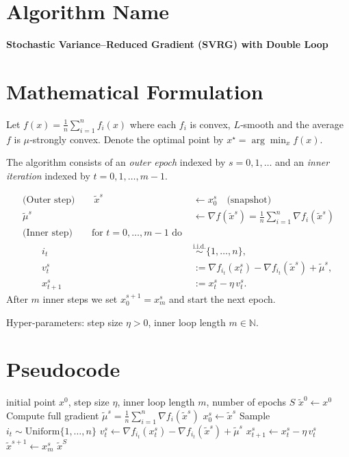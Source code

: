\documentclass[11pt]{article}
\newcommand{\grad}{\nabla}
\begin{document}
\section*{Algorithm Name}
\textbf{Stochastic Variance–Reduced Gradient (SVRG) with Double Loop}

\section*{Mathematical Formulation}
Let $f(x)=\frac{1}{n}\sum_{i=1}^{n}f_i(x)$ where each $f_i$ is convex, $L$‑smooth and the average $f$ is $\mu$‑strongly convex.  
Denote the optimal point by $x^{\star}=\arg\min_x f(x)$.  

The algorithm consists of an \emph{outer epoch} indexed by $s=0,1,\dots$ and an \emph{inner iteration} indexed by $t=0,1,\dots,m-1$.

\begin{align}
\text{(Outer step)}\qquad 
\tilde{x}^{s} &\gets x_{0}^{s} \quad\text{(snapshot)} \label{eq:snapshot}\\
\tilde{\mu}^{s} &\gets \grad f(\tilde{x}^{s})=\frac{1}{n}\sum_{i=1}^{n}\grad f_i(\tilde{x}^{s}) \tag{full gradient}\\[4pt]
\text{(Inner step)}\qquad 
\text{for }t=0,\dots,m-1 \text{ do } \nonumber\\
\qquad i_t &\stackrel{\text{i.i.d.}}{\sim}\{1,\dots,n\},\\
\qquad v_t^{s} &:= \grad f_{i_t}(x_t^{s})-\grad f_{i_t}(\tilde{x}^{s})+\tilde{\mu}^{s},\\
\qquad x_{t+1}^{s} &:= x_t^{s}-\eta\, v_t^{s}. \label{eq:update}
\end{align}
After $m$ inner steps we set $x_{0}^{s+1}=x_{m}^{s}$ and start the next epoch.

Hyper‑parameters: step size $\eta>0$, inner loop length $m\in\mathbb{N}$.

\section*{Pseudocode}
\begin{algorithm}[H]
\caption{SVRG (double loop)}
\begin{algorithmic}[1]
\REQUIRE initial point $x^{0}$, step size $\eta$, inner loop length $m$, number of epochs $S$
\STATE $\tilde{x}^{0}\gets x^{0}$
    \STATE Compute full gradient $\tilde{\mu}^{s}= \frac1n\sum_{i=1}^{n}\grad f_i(\tilde{x}^{s})$
    \STATE $x^{s}_0 \gets \tilde{x}^{s}$
        \STATE Sample $i_t\sim\text{Uniform}\{1,\dots,n\}$
        \STATE $v^{s}_t \gets \grad f_{i_t}(x^{s}_t)-\grad f_{i_t}(\tilde{x}^{s})+\tilde{\mu}^{s}$
        \STATE $x^{s}_{t+1} \gets x^{s}_t-\eta\,v^{s}_t$
    \ENDFOR
    \STATE $\tilde{x}^{s+1}\gets x^{s}_m$
\ENDFOR
\RETURN $\tilde{x}^{S}$
\end{algorithmic}
\end{algorithm}
\end{document}
